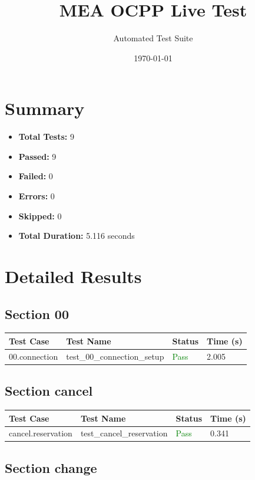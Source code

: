 \documentclass{article}
\title{MEA OCPP Live Test}
\author{Automated Test Suite}
\date{\today}
\begin{document}
\maketitle

\section{Summary}
\begin{itemize}
    \item \textbf{Total Tests:} 9
    \item \textbf{Passed:} 9
    \item \textbf{Failed:} 0
    \item \textbf{Errors:} 0
    \item \textbf{Skipped:} 0
    \item \textbf{Total Duration:} 5.116 seconds
\end{itemize}

\section{Detailed Results}
\subsection{Section 00}

\begin{longtable}{p{} p{} p{} p{}}
\toprule
\textbf{Test Case} & \textbf{Test Name} & \textbf{Status} & \textbf{Time (s)} \\
\midrule
\endhead
00.connection & test\_00\_connection\_setup & \textcolor{green}{Pass} & 2.005 \\
\bottomrule
\end{longtable}
\subsection{Section cancel}

\begin{longtable}{p{} p{} p{} p{}}
\toprule
\textbf{Test Case} & \textbf{Test Name} & \textbf{Status} & \textbf{Time (s)} \\
\midrule
\endhead
cancel.reservation & test\_cancel\_reservation & \textcolor{green}{Pass} & 0.341 \\
\bottomrule
\end{longtable}
\subsection{Section change}
\end{document}
